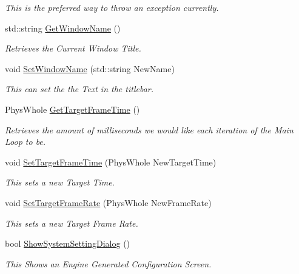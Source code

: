 \begin{DoxyCompactItemize}
\begin{DoxyCompactList}\small\item\em This is the preferred way to throw an exception currently. \item\end{DoxyCompactList}\item 
std::string \hyperlink{classPhysWorld_a09163480a549b39a945ee97415eabdc0}{GetWindowName} ()
\begin{DoxyCompactList}\small\item\em Retrieves the Current Window Title. \item\end{DoxyCompactList}\item 
void \hyperlink{classPhysWorld_adb5ba2b5a3140c5d7033d3180e3f7342}{SetWindowName} (std::string NewName)
\begin{DoxyCompactList}\small\item\em This can set the the Text in the titlebar. \item\end{DoxyCompactList}\item 
PhysWhole \hyperlink{classPhysWorld_a33e8430ed43897276ca55fbb47e54bcf}{GetTargetFrameTime} ()
\begin{DoxyCompactList}\small\item\em Retrieves the amount of milliseconds we would like each iteration of the Main Loop to be. \item\end{DoxyCompactList}\item 
void \hyperlink{classPhysWorld_ab1c6f9286bd97eb502d8b0ddc4954566}{SetTargetFrameTime} (PhysWhole NewTargetTime)
\begin{DoxyCompactList}\small\item\em This sets a new Target Time. \item\end{DoxyCompactList}\item 
void \hyperlink{classPhysWorld_af68a05d6ee84d901bb3ed0e175daa662}{SetTargetFrameRate} (PhysWhole NewFrameRate)
\begin{DoxyCompactList}\small\item\em This sets a new Target Frame Rate. \item\end{DoxyCompactList}\item 
bool \hyperlink{classPhysWorld_a9b83f04907443c6307956a3c4089e3ca}{ShowSystemSettingDialog} ()
\begin{DoxyCompactList}\small\item\em This Shows an Engine Generated Configuration Screen. \item\end{DoxyCompactList}\item 

\end{DoxyCompactItemize}
